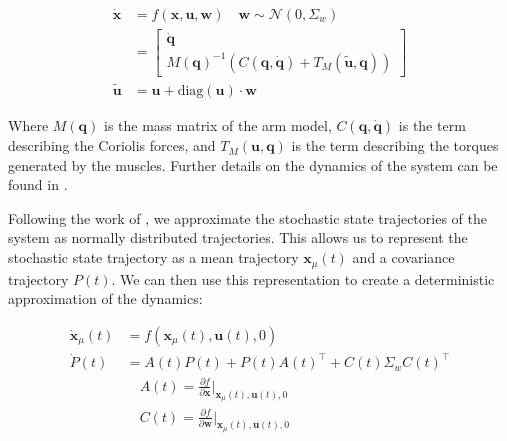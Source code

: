 \documentclass[table,12pt]{article}
\begin{document}
\begin{align}
    \dot{\mathbf{x}} &= f(\mathbf{x}, \mathbf{u}, \mathbf{w}) \quad \mathbf{w} \sim \mathcal{N}(0, \Sigma_w) \\
    &= \begin{bmatrix}
        \dot{\mathbf{q}} \\
        M(\mathbf{q})^{-1} \left(C(\mathbf{q}, \dot{\mathbf{q}}) + T_M(\tilde{\mathbf{u}}, \mathbf{q})\right)
    \end{bmatrix} \\
    \tilde{\mathbf{u}} &= \mathbf{u} + \text{diag}(\mathbf{u}) \cdot \mathbf{w}
\end{align}

Where $M(\mathbf{q})$ is the mass matrix of the arm model, $C(\mathbf{q}, \dot{\mathbf{q}})$ is the term describing the Coriolis forces, and $T_M(\mathbf{u}, \mathbf{q})$ is the term describing the torques generated by the muscles. Further details on the dynamics of the system can be found in \cite{c7}.

Following the work of \cite{c7}, we approximate the stochastic state trajectories of the system as normally distributed trajectories. This allows us to represent the stochastic state trajectory as a mean trajectory $\mathbf{x}_\mu(t)$ and a covariance trajectory $P(t)$. We can then use this representation to create a deterministic approximation of the dynamics: 

\begin{align*}
    \dot{\mathbf{x}}_\mu(t) &= f(\mathbf{x}_\mu(t), \mathbf{u}(t), 0) \\
    \dot{P}(t) &= A(t)P(t) + P(t)A(t)^\top + C(t) \Sigma_w C(t)^\top \\
    &\quad A(t) = \frac{\partial f}{\partial \mathbf{x}}\bigg|_{\mathbf{x}_\mu(t), \mathbf{u}(t), 0} \\
    &\quad C(t) = \frac{\partial f}{\partial \mathbf{w}}\bigg|_{\mathbf{x}_\mu(t), \mathbf{u}(t), 0}
\end{align*}
\end{document}
